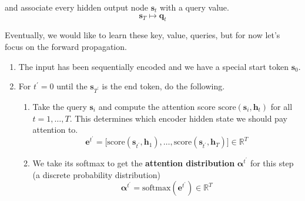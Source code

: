   and associate every hidden output node $\mathbf{s}_t$ with a query value. 
  \begin{equation}
    \mathbf{s}_T \mapsto \mathbf{q}_t
  \end{equation}

  \begin{definition} 
    Eventually, we would like to learn these key, value, queries, but for now let's focus on the forward propagation. 
    \begin{enumerate}
      \item The input has been sequentially encoded and we have a special start token $\mathbf{s}_0$. 
      \item For $t^\prime = 0$ until the $\mathbf{s}_{T^\prime}$ is the end token, do the following. 
      \begin{enumerate}
        \item Take the query $\mathbf{s}_i$ and compute the attention score $\mathrm{score}(\mathbf{s}_i, \mathbf{h}_t)$ for all $t = 1, \ldots, T$. This determines which encoder hidden state we should pay attention to. 
        \begin{equation}
          \mathbf{e}^{t^\prime} = \big[ \mathrm{score}(\mathbf{s}_{t^\prime}, \mathbf{h}_1 ), \ldots, \mathrm{score}(\mathbf{s}_{t^\prime}, \mathbf{h}_T) \big] \in \mathbb{R}^T
        \end{equation}

        \item We take its softmax to get the \textbf{attention distribution} $\boldsymbol{\alpha}^{t^\prime}$ for this step (a discrete probability distribution) 
        \begin{equation}
          \boldsymbol{\alpha}^{t^\prime} = \mathrm{softmax} (\mathbf{e}^{t^\prime}) \in \mathbb{R}^T
        \end{equation}


\end{enumerate}
\end{enumerate}
\end{definition}
